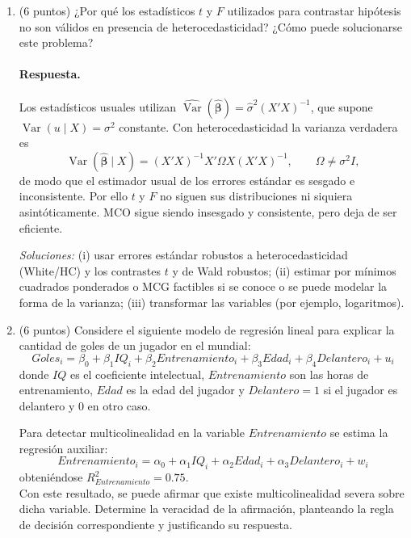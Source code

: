 \documentclass[letterpaper,11pt]{article}
\DeclareMathOperator{\var}{Var}
\newcommand{\respuesta}{\color{blue}\paragraph{Respuesta.}}
\newcommand{\fin}{\color{black}}
\begin{document}
\begin{enumerate}
\begin{enumerate}[label=\alph*)]
    \respuesta Como $F=4>F_{0{,}05}(5,70)=2{,}35$, se rechaza $H_0$ al 5\%.
    Hay evidencia de que la estructura salarial difiere entre el sector
    público y el privado, por lo que corresponde estimar ecuaciones separadas.
    \fin
\end{enumerate}

    \item\color{black}  (6 puntos) ¿Por qué los estadísticos \(t\) y \(F\) utilizados para contrastar hipótesis no son válidos en presencia de heterocedasticidad? ¿Cómo puede solucionarse este problema?

\respuesta Los estadísticos usuales utilizan
$\widehat{\var}(\widehat{\boldsymbol\beta})=\widehat\sigma^2(X'X)^{-1}$, que
supone $\var(u\mid X)=\sigma^2$ constante. Con heterocedasticidad la varianza
verdadera es
\[
    \var(\widehat{\boldsymbol\beta}\mid X)
    =(X'X)^{-1}X'\Omega X(X'X)^{-1},\qquad \Omega\neq\sigma^2I,
\]
de modo que el estimador usual de los errores estándar es sesgado e
inconsistente. Por ello $t$ y $F$ no siguen sus distribuciones ni siquiera
asintóticamente. MCO sigue siendo insesgado y consistente, pero deja de ser
eficiente.

\emph{Soluciones:} (i) usar errores estándar robustos a heterocedasticidad
(White/HC) y los contrastes $t$ y de Wald robustos; (ii) estimar por mínimos
cuadrados ponderados o MCG factibles si se conoce o se puede modelar la forma
de la varianza; (iii) transformar las variables (por ejemplo, logaritmos).
\fin

    \item\color{black}  (6 puntos) Considere el siguiente modelo de regresión lineal para explicar la cantidad de goles de un jugador en el mundial:
\[
Goles_i = \beta_0 + \beta_1 IQ_i + \beta_2 Entrenamiento_i + \beta_3 Edad_i + \beta_4 Delantero_i + u_i
\]
donde $IQ$ es el coeficiente intelectual, $Entrenamiento$ son las horas de entrenamiento, $Edad$ es la edad del jugador y $Delantero = 1$ si el jugador es delantero y $0$ en otro caso.

Para detectar multicolinealidad en la variable $Entrenamiento$ se estima la regresión auxiliar:
\[
Entrenamiento_i = \alpha_0 + \alpha_1 IQ_i + \alpha_2 Edad_i + \alpha_3 Delantero_i + w_i
\]
obteniéndose $R^2_{Entrenamiento} = 0.75$.\\

Con este resultado, se puede afirmar que existe multicolinealidad severa sobre dicha variable. Determine la veracidad de la afirmación, planteando la regla de decisión correspondiente y justificando su respuesta.


\end{enumerate}
\end{document}
